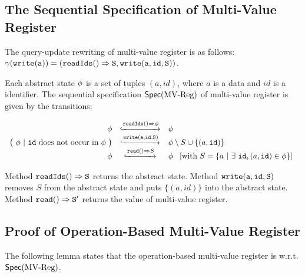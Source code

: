 


\subsection{The Sequential Specification of Multi-Value Register}
\label{subsec:the sequential specification of multi-value register}

The query-update rewriting of multi-value register is as follows: $\gamma( \alabelshort[{\tt write}]{a}) = ( \alabellong[{\tt readIds}]{}{S}{}, \alabelshort[{\tt write}]{a,id,S})$.

Each abstract state $\phi$ is a set of tuples $(a,id)$, where $a$ is a data and $id$ is a identifier. The sequential specification $\mathsf{Spec}(\text{MV\text{-}Reg})$ of multi-value register is given by the transitions:

\[
  \begin{array}{rcl}
    \abstate
    & \specarrow{\alabellong[\mathtt{readIds}]{}{\abstate}{}}
    & \abstate\\
    \big(\ \abstate\ |\ \mathtt{id}\ \text{does not occur in } \abstate\ \big)
             & \specarrow{ \alabelshort[{\tt write}]{a,id,S} }
    & \abstate \setminus S \cup \{ (a,\mathtt{id}) \}\\
    \abstate
    & \specarrow{\alabellong[\mathtt{read}]{}{ S }{}}
    & \abstate\
      \begin{array}{c}
        [\text{with}\ S = \{ a\ \vert\ \exists\ \mathtt{id}, (a,\mathtt{id}) \in \abstate \}]
      \end{array}
  \end{array}
\]

Method $\alabellong[{\tt readIds}]{}{S}{}$ returns the abstract state. Method $\alabelshort[{\tt write}]{a,id,S}$ removes $S$ from the abstract state and puts $\{ (a,id) \}$ into the abstract state. Method $\alabellong[{\tt read}]{}{S'}{}$ returns the value of multi-value register.



\subsection{Proof of Operation-Based Multi-Value Register}
\label{subsec:proof of operation-based multi-value register}

The following lemma states that the operation-based multi-value register is \crdtlinearizable{} w.r.t. $\mathsf{Spec}(\text{MV\text{-}Reg})$.

